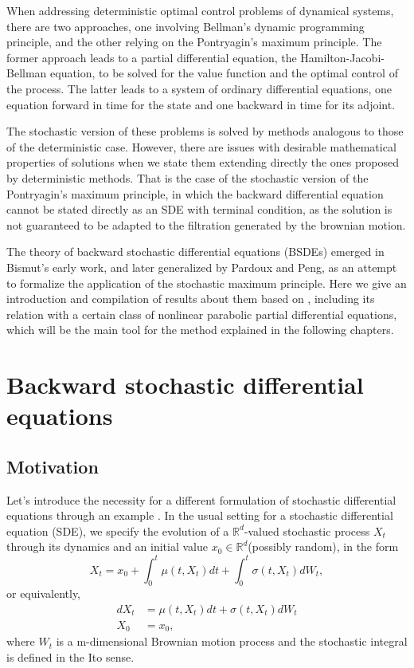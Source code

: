 When addressing deterministic optimal control problems of dynamical systems, there are two approaches, one involving Bellman's dynamic programming principle, and the other relying on the Pontryagin's maximum principle. The former approach leads to a partial differential equation, the Hamilton-Jacobi-Bellman equation, to be solved for the value function and the optimal control of the process. The latter leads to a system of ordinary differential equations, one equation forward in time for the state and one backward in time for its adjoint.

The stochastic version of these problems is solved by methods analogous to those of the deterministic case. However, there are issues with desirable mathematical properties of solutions when we state them extending directly the ones proposed by deterministic methods. That is the case of the stochastic version of the Pontryagin's maximum principle, in which the backward differential equation cannot be stated directly as an SDE with terminal condition, as the solution is not guaranteed to be adapted to the filtration generated by the brownian motion.

The theory of backward stochastic differential equations (BSDEs) emerged in Bismut's \cite{bismut_conjugate_1973} early work, and later generalized by Pardoux and Peng\cite{pardoux_adapted_1990}, as an attempt to formalize the application of the stochastic maximum principle. Here we give an introduction and compilation of results about them based on \cite{zhang_backward_2017,pardoux_stochastic_2014,romero_maestro_nodate,touzi_optimal_2013}, including its relation with a certain class of nonlinear parabolic partial differential equations, which will be the main tool for the method explained in the following chapters. 
\section{Backward stochastic differential equations}
\subsection{Motivation}
Let's introduce the necessity for a different formulation of stochastic differential equations through an example \cite{romero_maestro_nodate}. In the usual setting for a stochastic differential equation (SDE), we specify the evolution of a $\mathbb{R}^d$-valued stochastic process $X_t$ through its dynamics and an initial value $x_0\in \mathbb{R}^d$(possibly random), in the form
\begin{equation}
	X_t=x_0 +\int_{0}^{t}\mu(t,X_t)dt+\int_{0}^{t} \sigma(t,X_t) dW_t,
\end{equation}
or equivalently,
\begin{equation}
	\label{eqn:SDE}
	\begin{split}
		dX_t&=\mu(t,X_t)dt+\sigma(t,X_t)dW_t\\
		X_0&=x_0,
	\end{split}
\end{equation}
where $W_t$ is a m-dimensional Brownian motion process and the stochastic integral is defined in the Ito sense.

